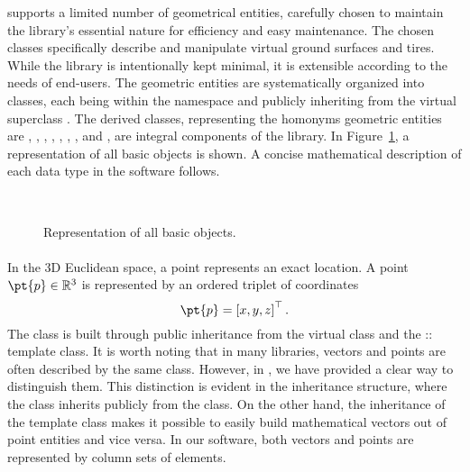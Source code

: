 \Acme{} supports a limited number of geometrical entities, carefully chosen to maintain the library's essential nature for efficiency and easy maintenance. The chosen classes specifically describe and manipulate virtual ground surfaces and tires. While the library is intentionally kept minimal, it is extensible according to the needs of end-users. The geometric entities are systematically organized into classes, each being within the \Acme{} namespace and publicly inheriting from the virtual superclass \Entity{}. The derived classes, representing the homonyms geometric entities are \Point{}, \Line{}, \Ray{}, \Plane{}, \Segment{}, \Triangle{}, \Disk{}, and \Ball{}, are integral components of the library. In Figure~\ref{app1:fig:acme_entities}, a representation of all \Acme{} basic \Entity{} objects is shown. A concise mathematical description of each data type in the software follows.

\begin{figure}[htb]
  \centering
  \def\svgwidth{9cm}
   \\[1.0em]
  \def\svgwidth{9cm}
  
  \caption{Representation of all \Acme{} basic \Entity{} objects.}
  \label{app1:fig:acme_entities}
\end{figure}

\paragraph{\Point{}}
In the 3D Euclidean space, a point represents an exact location. A point $\pt{p} \in \mathbb{R}^3$ is represented by an ordered triplet of coordinates
%
\begin{equation*}
  \pt{p} = \left[x, y, z\right]^{\top} \text{.}
\end{equation*}
%
The \Point{} class is built through public inheritance from the virtual class \Entity{} and the \Eigen{}::\MatrixBase{} template class. It is worth noting that in many \cpp{} libraries, vectors and points are often described by the same class. However, in \Acme{}, we have provided a clear way to distinguish them. This distinction is evident in the inheritance structure, where the \Point{} class inherits publicly from the \Entity{} class. On the other hand, the inheritance of the \MatrixBase{} template class makes it possible to easily build mathematical vectors out of point entities and vice versa. In our software, both vectors and points are represented by column sets of elements.

